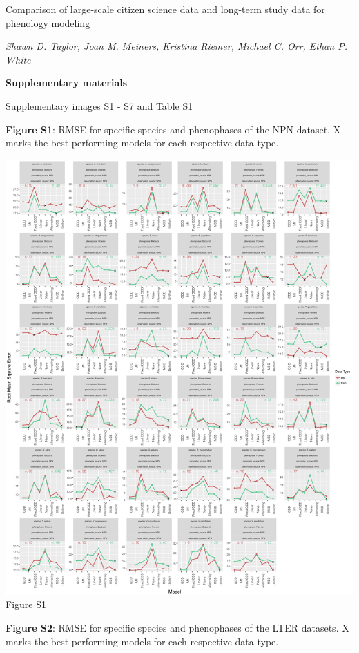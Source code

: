 \documentclass[a4paper,12pt]{article}
\begin{document}
{\Large Comparison of large-scale citizen science data and long-term study data for phenology modeling \par}

\textit{Shawn D. Taylor, Joan M. Meiners, Kristina Riemer, Michael C. Orr, Ethan P. White}

\textbf{\large Supplementary materials}

Supplementary images S1 - S7 and Table S1

\newpage

\textbf{Figure S1}: RMSE for specific species and phenophases of the NPN dataset. X marks the best performing models for each respective data type.

\newpage

\begin{center}
	\centering
		\includegraphics[width=1\textwidth]{supplement_best_npn_models.png}
	Figure S1
\end{center}

\newpage
\textbf{Figure S2}: RMSE for specific species and phenophases of the LTER datasets. X marks the best performing models for each respective data type.
\end{document}
